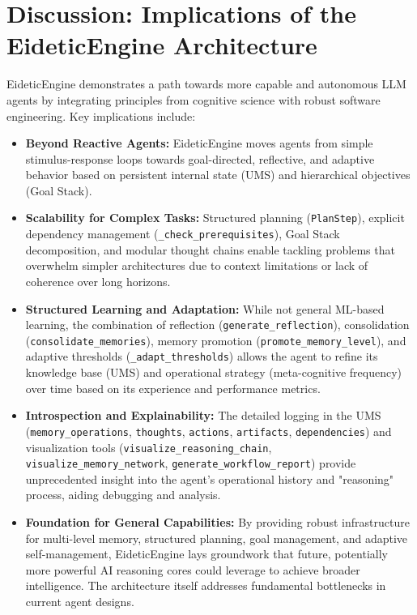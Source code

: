 \documentclass[12pt,a4paper]{article}
\newcommand{\code}[1]{\nolinkurl{#1}}
\begin{document}
\section{Discussion: Implications of the EideticEngine Architecture}

EideticEngine demonstrates a path towards more capable and autonomous LLM agents by integrating principles from cognitive science with robust software engineering. Key implications include:

\begin{itemize}
    \item \textbf{Beyond Reactive Agents:} EideticEngine moves agents from simple stimulus-response loops towards goal-directed, reflective, and adaptive behavior based on persistent internal state (UMS) and hierarchical objectives (Goal Stack).

    \item \textbf{Scalability for Complex Tasks:} Structured planning (\code{PlanStep}), explicit dependency management (\code{\_check\_prerequisites}), Goal Stack decomposition, and modular thought chains enable tackling problems that overwhelm simpler architectures due to context limitations or lack of coherence over long horizons.

    \item \textbf{Structured Learning and Adaptation:} While not general ML-based learning, the combination of reflection (\code{generate\_reflection}), consolidation (\code{consolidate\_memories}), memory promotion (\code{promote\_memory\_level}), and adaptive thresholds (\code{\_adapt\_thresholds}) allows the agent to refine its knowledge base (UMS) and operational strategy (meta-cognitive frequency) over time based on its experience and performance metrics.

    \item \textbf{Introspection and Explainability:} The detailed logging in the UMS (\code{memory\_operations}, \code{thoughts}, \code{actions}, \code{artifacts}, \code{dependencies}) and visualization tools (\code{visualize\_reasoning\_chain}, \code{visualize\_memory\_network}, \code{generate\_workflow\_report}) provide unprecedented insight into the agent's operational history and "reasoning" process, aiding debugging and analysis.

    \item \textbf{Foundation for General Capabilities:} By providing robust infrastructure for multi-level memory, structured planning, goal management, and adaptive self-management, EideticEngine lays groundwork that future, potentially more powerful AI reasoning cores could leverage to achieve broader intelligence. The architecture itself addresses fundamental bottlenecks in current agent designs.
\end{itemize}
\end{document}
